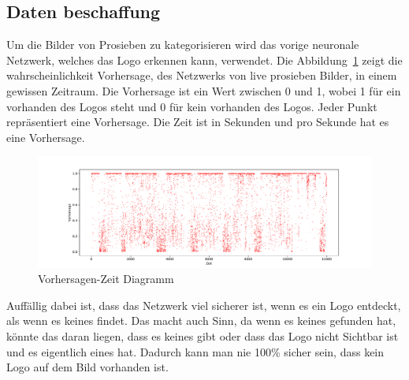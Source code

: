 \documentclass[12pt,a4paper]{report}
\begin{document}
\subsection{Daten beschaffung}
Um die Bilder von Prosieben zu kategorisieren wird das vorige neuronale Netzwerk,
welches das Logo erkennen kann, verwendet.
Die Abbildung~\ref{fig:points} zeigt die wahrscheinlichkeit Vorhersage, des Netzwerks von live prosieben Bilder, in einem gewissen Zeitraum.
Die Vorhersage ist ein Wert zwischen 0 und 1, wobei 1 für ein vorhanden des Logos steht und 0 für kein vorhanden des Logos.
Jeder Punkt repräsentiert eine Vorhersage.
Die Zeit ist in Sekunden und pro Sekunde hat es eine Vorhersage.
\begin{figure}[h]%
    \centering
    \includegraphics[width=1.0\textwidth]{assets/python/points.pdf}%
    \caption{Vorhersagen-Zeit Diagramm}%
    \label{fig:points}%
\end{figure}
Auffällig dabei ist, dass das Netzwerk viel sicherer ist, wenn es ein Logo entdeckt, als wenn es keines findet.
Das macht auch Sinn, da wenn es keines gefunden hat, könnte das daran liegen,
dass es keines gibt oder dass das Logo nicht Sichtbar ist und es eigentlich eines hat.
Dadurch kann man nie 100\% sicher sein, dass kein Logo auf dem Bild vorhanden ist.
\end{document}
